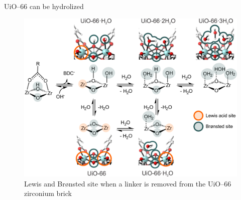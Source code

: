 UiO--66 can be hydrolized \cite{decoste2013stability}

\begin{figure}[!htbp]
	\centering
 	\includegraphics[width=1.0\textwidth]{bronsted-lewis-uio}
	\caption{Lewis and Br\o{}nsted site when a linker is removed from the UiO--66 zirconium brick}
	\label{fig:bronsted-lewis-uio}
\end{figure}

